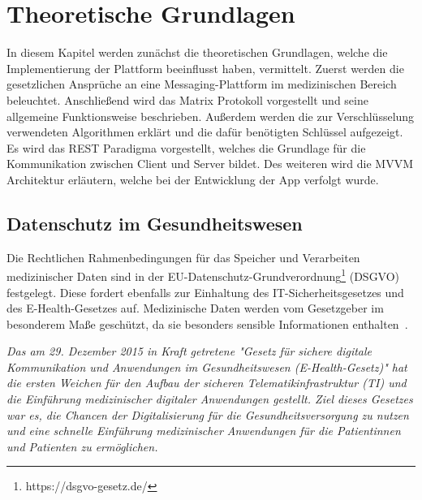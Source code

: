     \newpage
    \chapter{Theoretische Grundlagen}\label{ch:theoretische-grundlagen}
    In diesem Kapitel werden zunächst die theoretischen Grundlagen, welche die Implementierung der Plattform beeinflusst haben, vermittelt.
    Zuerst werden die gesetzlichen Ansprüche an eine Messaging-Plattform im medizinischen Bereich beleuchtet.
    Anschließend wird das Matrix Protokoll vorgestellt und seine allgemeine Funktionsweise beschrieben.
    Außerdem werden die zur Verschlüsselung verwendeten Algorithmen erklärt und die dafür benötigten Schlüssel aufgezeigt.
    Es wird das REST Paradigma vorgestellt, welches die Grundlage für die Kommunikation zwischen Client und Server bildet.
    Des weiteren wird die MVVM Architektur erläutern, welche bei der Entwicklung der App verfolgt wurde.

    \section{Datenschutz im Gesundheitswesen}\label{sec:datenschutz-im-gesundheitswesen}
    Die Rechtlichen Rahmenbedingungen für das Speicher und Verarbeiten medizinischer Daten sind in der EU-Datenschutz-Grundverordnung\footnote{https://dsgvo-gesetz.de/} (DSGVO) festgelegt.
    Diese fordert ebenfalls zur Einhaltung des IT-Sicherheitsgesetzes und des E-Health-Gesetzes auf.
    Medizinische Daten werden vom Gesetzgeber im besonderem Maße geschützt, da sie besonders sensible Informationen enthalten~\cite{datenschutzimgesundeitswesen}.

    \textit{Das am 29. Dezember 2015 in Kraft getretene "Gesetz für sichere digitale Kommunikation und Anwendungen im Gesundheitswesen (E-Health-Gesetz)" hat die ersten Weichen für den Aufbau der sicheren Telematikinfrastruktur (TI) und die Einführung medizinischer digitaler Anwendungen gestellt.
    Ziel dieses Gesetzes war es, die Chancen der Digitalisierung für die Gesundheitsversorgung zu nutzen und eine schnelle Einführung medizinischer Anwendungen für die Patientinnen und Patienten zu ermöglichen.}~\cite{ehealthgesetz}

